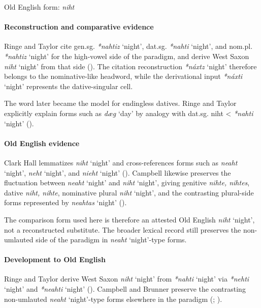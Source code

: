 \documentclass[
  british,
  a4paper,
]{article}
\providecommand{\Recon}[1]{\emph{*#1}}
\begin{document}
Old English form: \emph{niht}

\paragraph{Reconstruction and comparative
evidence}\label{reconstruction-and-comparative-evidence-128}

Ringe and Taylor cite gen.sg. \Recon{nahtiz} `night', dat.sg.
\Recon{nahti} `night', and nom.pl. \Recon{nahtiz} `night' for the
high-vowel side of the paradigm, and derive West Saxon {\emph{niht}}
`night' from that side (). The citation reconstruction \Recon{náxtz} `night' therefore
belongs to the nominative-like headword, while the derivational input
\Recon{náxti} `night' represents the dative-singular cell.

The word later became the model for endingless datives. Ringe and Taylor
explicitly explain forms such as {\emph{dæg}} `day' by analogy with
dat.sg. niht \textless{} \Recon{nahti} `night'
().

\paragraph{Old English evidence}\label{old-english-evidence-128}

Clark Hall lemmatizes {\emph{niht}} `night' and cross-references forms
such as {\emph{neaht}} `night', {\emph{neht}} `night', and
{\emph{nieht}} `night' (). Campbell likewise preserves the fluctuation between
{\emph{neaht}} `night' and {\emph{niht}} `night', giving genitive
\emph{nihte, nihtes}, dative \emph{niht, nihte}, nominative plural
\emph{niht} `night', and the contrasting plural-side forms represented
by {\emph{neahtas}} `night' ().

The comparison form used here is therefore an attested Old English
\emph{niht} `night', not a reconstructed substitute. The broader lexical
record still preserves the non-umlauted side of the paradigm in
{\emph{neaht}} `night'-type forms.

\paragraph{Development to Old
English}\label{development-to-old-english-128}

Ringe and Taylor derive West Saxon \emph{niht} `night' from
\Recon{nahti} `night' via \Recon{nehti} `night' and \Recon{neahti}
`night' ().
Campbell and Brunner preserve the contrasting non-umlauted
{\emph{neaht}} `night'-type forms elsewhere in the paradigm
(;
).
\end{document}
